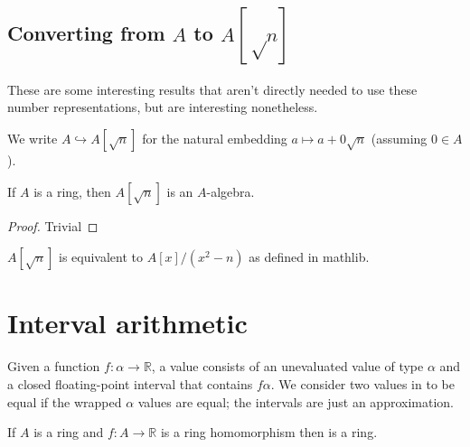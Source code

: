 \subsection{Converting from $A$ to $A[√n]$}

These are some interesting results that aren't directly needed to use these
number representations, but are interesting nonetheless.


\begin{definition}
  \label{def:adjoinOfA}
  \leanok
  We write $A \hookrightarrow A[\sqrt{n}]$ for the natural embedding
  $a \mapsto a + 0\sqrt{n}$ (assuming $0 ∈ A$).
\end{definition}


\begin{lemma}
  \label{thm:adjoinAlgebra}
  \leanok
  If $A$ is a ring, then $A[\sqrt{n}]$ is an $A$-algebra.
\end{lemma}

\begin{proof}
  Trivial
  \leanok
\end{proof}

\begin{lemma}
  \label{thm:mathlibAdjoin}
  $A[\sqrt{n}]$ is equivalent to $A[x] / (x^2 - n)$ as defined in mathlib.
\end{lemma}

\section{Interval arithmetic}

\begin{definition}
  \label{def:filtered}
  \leanok
  Given a function $f : α → ℝ$, a  value consists of
  an unevaluated value of type $α$ and a closed floating-point interval that
  contains $f α$. We consider two values in  to be
  equal if the wrapped $α$ values are equal; the intervals are just an
  approximation.
\end{definition}

\begin{lemma}
  \label{thm:filteredRing}
  \leanok
  If $A$ is a ring and $f : A → ℝ$ is a ring homomorphism then 
  is a ring.
\end{lemma}

